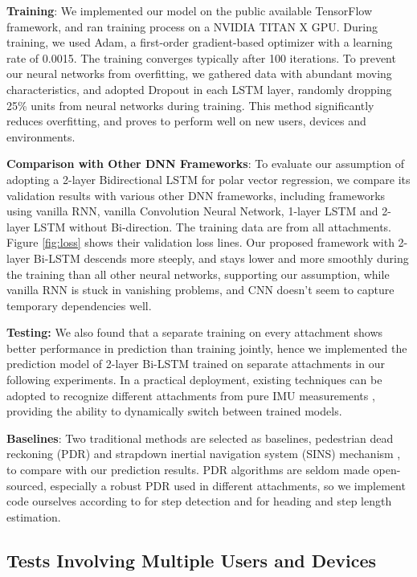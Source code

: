 \documentclass[letterpaper]{article}
\begin{document}
    \textbf{Training}: We implemented our model on the public available TensorFlow framework, and ran training process on a NVIDIA TITAN X GPU. During training, we used Adam, a first-order gradient-based optimizer \cite{Kingma2014} with a learning rate of 0.0015. The training converges typically after 100 iterations. To prevent our neural networks from overfitting, we gathered data with abundant moving characteristics, and adopted Dropout \cite{Srivastava2014} in each LSTM layer, randomly dropping 25\% units from neural networks during training. This method significantly reduces overfitting, and proves to perform well on new users, devices and environments. 

	\textbf{Comparison with Other DNN Frameworks}: To evaluate our assumption of adopting a 2-layer Bidirectional LSTM for polar vector regression, we compare its validation results with various other DNN frameworks, including frameworks using vanilla RNN, vanilla Convolution Neural Network, 1-layer LSTM and 2-layer LSTM without Bi-direction. The training data are from all attachments. Figure \ref{fig:loss} shows their validation loss lines. Our proposed framework with 2-layer Bi-LSTM descends more steeply, and stays lower and more smoothly during the training than all other neural networks, supporting our assumption, while vanilla RNN is stuck in vanishing problems, and CNN doesn't seem to capture temporary dependencies well. 
    
    \textbf{Testing:} We also found that a separate training on every attachment shows better performance in prediction than training jointly, hence we implemented the prediction model of 2-layer Bi-LSTM trained on separate attachments in our following experiments. In a practical deployment, existing techniques can be adopted to recognize different attachments from pure IMU measurements \cite{Brajdic2013}, providing the ability to dynamically switch between trained models.

	\textbf{Baselines}: Two traditional methods are selected as baselines, pedestrian dead reckoning (PDR) and strapdown inertial navigation system (SINS) mechanism \cite{Savage1998}, to compare with our prediction results. PDR algorithms are seldom made open-sourced, especially a robust PDR used in different attachments, so we implement code ourselves according to \cite{Brajdic2013} for step detection and \cite{Xiao2014} for heading and step length estimation.

\subsection{Tests Involving Multiple Users and Devices}
	
\end{document}
